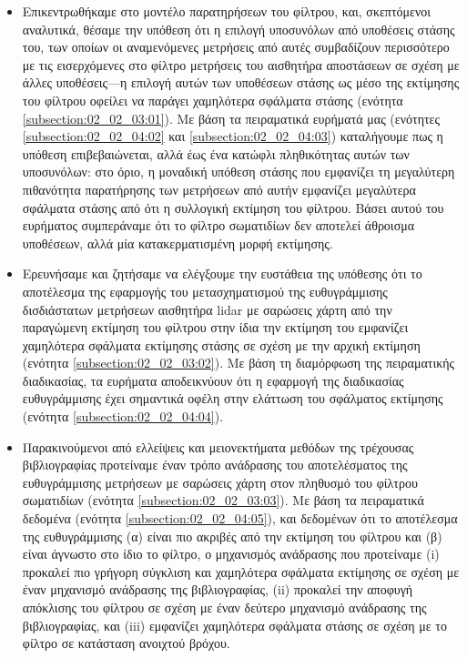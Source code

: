 \begin{itemize}
  \item Επικεντρωθήκαμε στο μοντέλο παρατηρήσεων του φίλτρου, και, σκεπτόμενοι
        αναλυτικά, θέσαμε την υπόθεση ότι η επιλογή υποσυνόλων από υποθέσεις
        στάσης του, των οποίων οι αναμενόμενες μετρήσεις από αυτές συμβαδίζουν
        περισσότερο με τις εισερχόμενες στο φίλτρο μετρήσεις του αισθητήρα
        αποστάσεων σε σχέση με άλλες υποθέσεις---η επιλογή αυτών των υποθέσεων
        στάσης ως μέσο της εκτίμησης του φίλτρου οφείλει να παράγει χαμηλότερα
        σφάλματα στάσης (ενότητα \ref{subsection:02_02_03:01}). Με βάση τα
        πειραματικά ευρήματά μας (ενότητες \ref{subsection:02_02_04:02} και
        \ref{subsection:02_02_04:03}) καταλήγουμε πως η υπόθεση επιβεβαιώνεται,
        αλλά έως ένα κατώφλι πληθικότητας αυτών των υποσυνόλων: στο όριο, η
        μοναδική υπόθεση στάσης που εμφανίζει τη μεγαλύτερη πιθανότητα
        παρατήρησης των μετρήσεων από αυτήν εμφανίζει μεγαλύτερα σφάλματα
        στάσης από ότι η συλλογική εκτίμηση του φίλτρου. Βάσει αυτού του
        ευρήματος συμπεράναμε ότι το φίλτρο σωματιδίων δεν αποτελεί άθροισμα
        υποθέσεων, αλλά μία κατακερματισμένη μορφή εκτίμησης.
  \item Ερευνήσαμε και ζητήσαμε να ελέγξουμε την ευστάθεια της υπόθεσης ότι
        το αποτέλεσμα της εφαρμογής του μετασχηματισμού της ευθυγράμμισης
        δισδιάστατων μετρήσεων αισθητήρα lidar με σαρώσεις χάρτη από την
        παραγώμενη εκτίμηση του φίλτρου στην ίδια την εκτίμηση του εμφανίζει
        χαμηλότερα σφάλματα εκτίμησης στάσης σε σχέση με την αρχική εκτίμηση
        (ενότητα \ref{subsection:02_02_03:02}). Με βάση τη διαμόρφωση της
        πειραματικής διαδικασίας, τα ευρήματα αποδεικνύουν ότι η εφαρμογή της
        διαδικασίας ευθυγράμμισης έχει σημαντικά οφέλη στην ελάττωση του
        σφάλματος εκτίμησης (ενότητα \ref{subsection:02_02_04:04}).
  \item Παρακινούμενοι από ελλείψεις και μειονεκτήματα μεθόδων της τρέχουσας
        βιβλιογραφίας προτείναμε έναν τρόπο ανάδρασης του αποτελέσματος της
        ευθυγράμμισης μετρήσεων με σαρώσεις χάρτη στον πληθυσμό του φίλτρου
        σωματιδίων (ενότητα \ref{subsection:02_02_03:03}). Με βάση τα
        πειραματικά δεδομένα (ενότητα \ref{subsection:02_02_04:05}), και
        δεδομένων ότι το αποτέλεσμα της ευθυγράμμισης (α) είναι πιο ακριβές από
        την εκτίμηση του φίλτρου και (β) είναι άγνωστο στο ίδιο το φίλτρο, ο
        μηχανισμός ανάδρασης που προτείναμε (i) προκαλεί πιο γρήγορη σύγκλιση
        και χαμηλότερα σφάλματα εκτίμησης σε σχέση με έναν μηχανισμό ανάδρασης
        της βιβλιογραφίας, (ii) προκαλεί την αποφυγή απόκλισης του φίλτρου σε
        σχέση με έναν δεύτερο μηχανισμό ανάδρασης της βιβλιογραφίας, και (iii)
        εμφανίζει χαμηλότερα σφάλματα στάσης σε σχέση με το φίλτρο σε κατάσταση
        ανοιχτού βρόχου.
\end{itemize}

